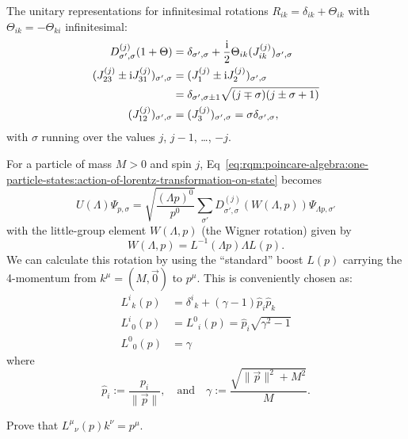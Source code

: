 The unitary representations for infinitesimal rotations
$R_{ik}=\delta_{ik}+\Theta_{ik}$ with $\Theta_{ik}=-\Theta_{ki}$
infinitesimal:
\begin{subequations}
\begin{align}
D^{(j)}_{\sigma',\sigma}(1 + \Theta) &= \delta_{\sigma',\sigma} + \frac{\I}{2}\Theta_{ik}(J^{(j)}_{ik})_{\sigma',\sigma}\\
(J^{(j)}_{23}\pm\I J^{(j)}_{31})_{\sigma',\sigma} &= (J^{(j)}_{1}\pm\I J^{(j)}_{2})_{\sigma',\sigma}\nonumber\\
&= \delta_{\sigma',\sigma\pm1}\sqrt{(j\mp\sigma)(j\pm\sigma+1)}\\
(J^{(j)}_{12})_{\sigma',\sigma} &= (J^{(j)}_{3})_{\sigma',\sigma} = \sigma\delta_{\sigma',\sigma},
\end{align}
\end{subequations}
with $\sigma$ running over the values $j$, $j-1$, \dots, $-j$.

\M
For a particle of mass $M>0$ and spin $j$, Eq~\eqref{eq:rqm:poincare-algebra:one-particle-states:action-of-lorentz-transformation-on-state}
becomes
\begin{equation}
U(\Lambda)\Psi_{p,\sigma}
=\sqrt{\frac{(\Lambda p)^{0}}{p^{0}}}\sum_{\sigma'}D^{(j)}_{\sigma',\sigma}(W(\Lambda,p))
\Psi_{\Lambda p,\sigma'}
\end{equation}
with the little-group element $W(\Lambda, p)$ (the Wigner rotation)
given by
\begin{equation*}
W(\Lambda, p) = L^{-1}(\Lambda p)\Lambda L(p).
\end{equation*}
We can calculate this rotation by using the ``standard'' boost $L(p)$
carrying the 4-momentum from $k^{\mu}=(M,\vec{0})$ to $p^{\mu}$. This is
conveniently chosen as:
\begin{subequations}
\begin{align}
{L^{i}}_{k}(p) &= {\delta^{i}}_{k} + (\gamma - 1)\widehat{p}_{i}\widehat{p}_{k}\\
{L^{i}}_{0}(p) &= {L^{0}}_{i}(p) = \widehat{p}_{i}\sqrt{\gamma^{2}-1}\\
{L^{0}}_{0}(p) &= \gamma
\end{align}
\end{subequations}
where
\begin{equation}
\widehat{p}_{i}:=\frac{p_{i}}{\|\vec{p}\|},\quad\mbox{and}\quad
\gamma:=\frac{\sqrt{\|\vec{p}\|^{2}+M^{2}}}{M}.
\end{equation}

\begin{exercise}
Prove that ${L^{\mu}}_{\nu}(p)k^{\nu}=p^{\mu}$.
\end{exercise}

